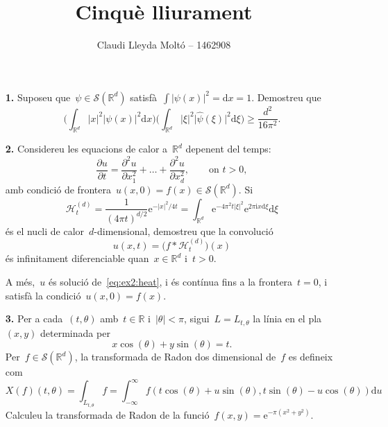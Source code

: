 \documentclass[a4paper]{article}
\title{Cinquè lliurament}
\author{Claudi Lleyda Moltó -- 1462908}
\theoremstyle{plain}
\theoremstyle{definition}
\newcommand{\iu}{\mathrm{i}}
\newcommand{\e}{\mathrm{e}}
\providecommand{\uppi}{\pi}
\newcommand{\diff}{\mathrm{d}}
\newcommand{\abs}[1]{\lvert{#1}\rvert}
\newcommand{\Sc}{\mathcal{S}}
\newcommand{\Hk}{\mathcal{H}}
\newcommand{\RR}{\mathbb{R}}
\begin{document}
\maketitle

\begin{enumerate}
    \item[\textbf{1.}] Suposeu que~\(\psi\in\Sc(\RR^{d})\)
        satisfà~\(\int\abs{\psi(x)}^{2}=\diff x=1\). Demostreu que
        \[
            \biggl(\int_{\RR^{d}}\abs{x}^{2}\abs{\psi(x)}^{2}\diff x\biggr)
            \biggl(\int_{\RR^{d}}\abs{\xi}^{2}\abs{\widehat{\psi}(\xi)}^{2}\diff\xi\biggr)
            \geq
            \frac{d^{2}}{16\uppi^{2}}.
        \]
\end{enumerate}

\begin{enumerate}
    \item[\textbf{2.}] Considereu les equacions de calor a~\(\RR^{d}\) depenent
        del temps:
    \begin{equation}
        \label{eq:ex2:heat}
        \frac{\partial u}{\partial t}
        =
        \frac{\partial^{2}u}{\partial x_{1}^{2}}
        + \dots +
        \frac{\partial^{2}u}{\partial x_{d}^{2}},
        \qquad
        \text{on }
        t>0,
    \end{equation}
    amb condició de frontera~\(u(x,0)=f(x)\in\Sc(\RR^{d})\).
    Si
    \[
        \Hk_{t}^{(d)}
        =
        \frac{1}{(4\uppi t)^{d/2}}
        \e^{-\abs{x}^{2}/4t}
        =
        \int_{\RR^{d}}
        \e^{-4\uppi^{2}t\abs{\xi}^{2}}
        \e^{2\uppi\iu x\diff\xi}
        \diff\xi
    \]
    és el nucli de calor~\(d\)-dimensional, demostreu que la convolució
    \[
        u(x,t)
        =
        \bigl(f\ast\Hk_{t}^{(d)}\bigr)(x)
    \]
    és infinitament diferenciable quan~\(x\in\RR^{d}\) i~\(t>0\).

    A més,~\(u\) és solució de~\eqref{eq:ex2:heat},
    i és contínua fins a la frontera~\(t=0\),
    i satisfà la condició~\(u(x,0)=f(x)\).
\end{enumerate}

\begin{enumerate}
    \item[\textbf{3.}] Per a cada~\((t,\theta)\) amb~\(t\in\RR\)
        i~\(\abs{\theta}<\uppi\), sigui~\(L=L_{t,\theta}\) la línia en el
        pla~\((x,y)\) determinada per
        \[
            x\cos(\theta) + y\sin(\theta) = t.
        \]
        Per~\(f\in\Sc(\RR^{d})\), la transformada de Radon dos dimensional
        de~\(f\) es defineix com
        \[
            X(f)(t,\theta)
            =
            \int_{L_{t,\theta}}f
            =
            \int_{-\infty}^{\infty}
            f(t\cos(\theta) + u\sin(\theta), t\sin(\theta) - u\cos(\theta))
            \diff u
        \]
        Calculeu la transformada de Radon de la
        funció~\(f(x,y)=\e^{-\uppi(x^{2}+y^{2})}\).
\end{enumerate}
\end{document}
